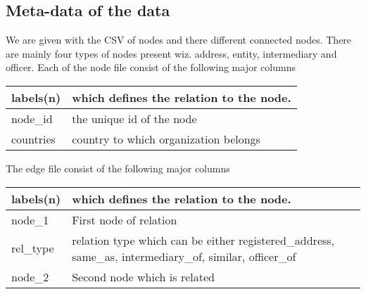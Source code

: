 \subsection{Meta-data of the data}
We are given with the CSV of nodes and there different connected nodes. There are mainly four types of nodes present wiz. address, entity, intermediary and officer.
Each of the node file consist of the following major columns


\begin{longtable}{ | p{2cm} | p{9cm} | } 
\hline
labels(n) & which defines the relation to the node. \\ 
\hline
node\_id & the unique id of the node \\
\hline
countries & country to which organization belongs \\ 
\hline
\end{longtable}

The edge file consist of the following major columns

    \begin{longtable}{ | p{2cm} | p{9cm} | } 
        \hline
            labels(n) & which defines the relation to the node. \\ 
        \hline
            node\_1 & First node of relation \\
        \hline
            rel\_type & relation type which can be either registered\_address, same\_as, intermediary\_of, similar, officer\_of \\ 
        \hline
            node\_2 & Second node which is related \\
        \hline
    \end{longtable}
